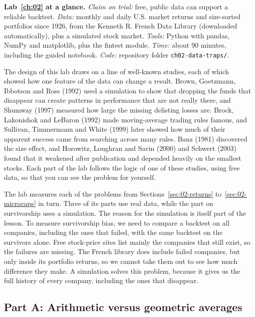 \begin{callout}
\textbf{Lab~\ref{ch:02} at a glance.} \emph{Claim on trial:} free, public data can support a reliable backtest. \emph{Data:} monthly and daily U.S. market returns and size-sorted portfolios since 1926, from the Kenneth R. French Data Library (downloaded automatically), plus a simulated stock market. \emph{Tools:} Python with pandas, NumPy and matplotlib, plus the fintest module. \emph{Time:} about 90 minutes, including the guided notebook. \emph{Code:} repository folder \texttt{ch02-data-traps/}.
\end{callout}

The design of this lab draws on a line of well-known studies, each of which showed how one feature of the data can change a result. Brown, Goetzmann, Ibbotson and Ross (1992) used a simulation to show that dropping the funds that disappear can create patterns in performance that are not really there, and Shumway (1997) measured how large the missing delisting losses are. Brock, Lakonishok and LeBaron (1992) made moving-average trading rules famous, and Sullivan, Timmermann and White (1999) later showed how much of their apparent success came from searching across many rules. Banz (1981) discovered the size effect, and Horowitz, Loughran and Savin (2000) and Schwert (2003) found that it weakened after publication and depended heavily on the smallest stocks. Each part of the lab follows the logic of one of these studies, using free data, so that you can see the problem for yourself.

The lab measures each of the problems from Sections~\ref{sec:02-returns} to~\ref{sec:02-microcaps} in turn. Three of its parts use real data, while the part on survivorship uses a simulation. 
The reason for the simulation is itself part of the lesson. To measure survivorship bias, we need to compare a backtest on all companies, including the ones that failed, with the same backtest on the survivors alone. Free stock-price sites list mainly the companies that still exist, so the failures are missing. The French library does include failed companies, but only inside its portfolio returns, so we cannot take them out to see how much difference they make. A simulation solves this problem, because it gives us the full history of every company, including the ones that disappear.



\subsection*{Part A: Arithmetic versus geometric averages}

